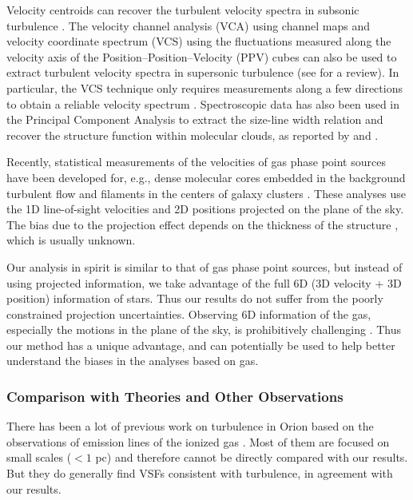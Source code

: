 Velocity centroids can recover the turbulent velocity spectra in subsonic turbulence 
\citep{esquivel_velocity_2005}. 
The velocity channel analysis (VCA)
using channel maps and 
velocity coordinate spectrum (VCS)
using the fluctuations 
measured along the velocity axis of the Position--Position--Velocity (PPV) cubes
can also be used to extract turbulent velocity spectra in supersonic turbulence
(see \cite{lazarian_obtaining_2009} for a review). 
In particular, the VCS technique only requires measurements along a few directions to obtain a reliable velocity spectrum
\citep{chepurnov_turbulence_2009}. Spectroscopic data has also been used in the Principal Component Analysis to extract the size-line width relation and recover the structure function within molecular clouds, as reported by \citet{heyer_universality_2004} and \citet{roman-duval_turbulence_2011}.

Recently, statistical measurements of the velocities of gas phase point sources have been developed for, e.g., dense molecular cores embedded in the background turbulent flow \citep{qian_13co_2012} and filaments in the centers of galaxy clusters \citep{li_direct_2020}. These analyses use the 1D line-of-sight velocities and 2D positions projected on the plane of the sky. The bias due to the projection effect depends on the thickness of the structure \citep{qian_new_2015}, which is usually unknown.

Our analysis in spirit is similar to that of gas phase point sources, but instead of using projected information, we take advantage of the full 6D (3D velocity + 3D position) information of stars. Thus our results do not suffer from the poorly constrained projection uncertainties. Observing 6D information of the gas, especially the motions in the plane of the sky, is prohibitively challenging \citep[although see][]{odell_high_2008}. Thus our method has a unique advantage, and can potentially be used to help better understand the biases in the analyses based on gas.


\subsubsection{Comparison with Theories and Other Observations}

There has been a lot of previous work on turbulence in Orion based on the observations of emission lines of the ionized gas \citep{castaneda_velocity_1988, odell_motion_1992, mcleod_nebular_2016, arthur_turbulence_2016}. Most of them are focused on small scales ($<1$ pc) and therefore cannot be directly compared with our results. But they do generally find VSFs consistent with turbulence, in agreement with our results.

